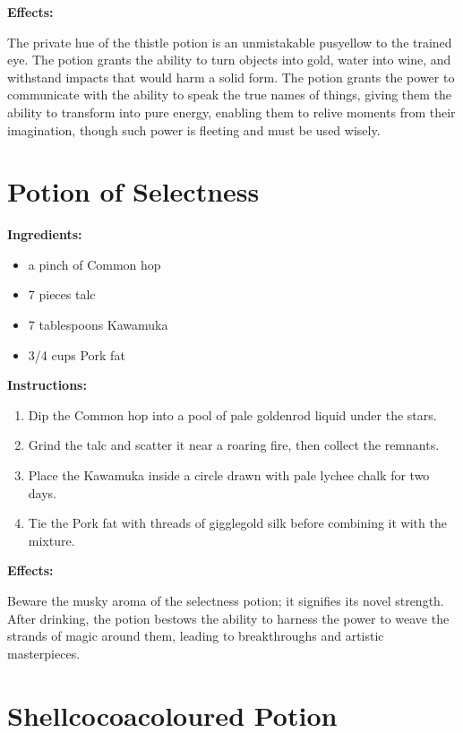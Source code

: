 \documentclass{article}
\begin{document}
\textbf{Effects:}

The private hue of the thistle potion is an unmistakable pusyellow to the trained eye. The potion grants the ability to turn objects into gold, water into wine, and withstand impacts that would harm a solid form. The potion grants the power to communicate with the ability to speak the true names of things, giving them the ability to transform into pure energy, enabling them to relive moments from their imagination, though such power is fleeting and must be used wisely.

\newpage
\section*{Potion of Selectness}

\textbf{Ingredients:}

\begin{itemize}
  \item a pinch of Common hop
  \item 7 pieces talc
  \item 7 tablespoons Kawamuka
  \item 3/4 cups Pork fat
\end{itemize}

\textbf{Instructions:}

\begin{enumerate}
  \item Dip the Common hop into a pool of pale goldenrod liquid under the stars.
  \item Grind the talc and scatter it near a roaring fire, then collect the remnants.
  \item Place the Kawamuka inside a circle drawn with pale lychee chalk for two days.
  \item Tie the Pork fat with threads of gigglegold silk before combining it with the mixture.
\end{enumerate}

\textbf{Effects:}

Beware the musky aroma of the selectness potion; it signifies its novel strength. After drinking, the potion bestows the ability to harness the power to weave the strands of magic around them, leading to breakthroughs and artistic masterpieces.

\newpage
\section*{Shellcocoacoloured Potion}
\end{document}
